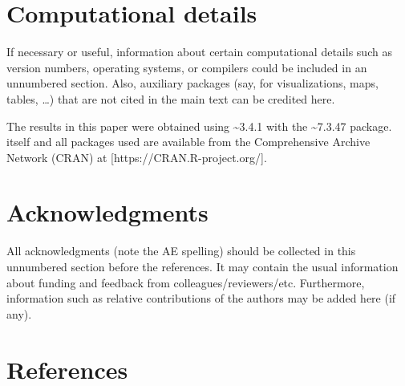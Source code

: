 \documentclass[
  nojss,
  article]{jss}
\begin{document}
\section*{Computational details}\label{computational-details}

\begin{tcolorbox}[enhanced jigsaw, colframe=quarto-callout-color-frame, colback=white, rightrule=.15mm, toprule=.15mm, breakable, arc=.35mm, bottomrule=.15mm, leftrule=.75mm, left=2mm, opacityback=0]

If necessary or useful, information about certain computational details
such as version numbers, operating systems, or compilers could be
included in an unnumbered section. Also, auxiliary packages (say, for
visualizations, maps, tables, \ldots) that are not cited in the main
text can be credited here.

\end{tcolorbox}

The results in this paper were obtained using
\textasciitilde3.4.1 with the
\textasciitilde7.3.47 package.  itself and all
packages used are available from the Comprehensive  Archive
Network (CRAN) at {[}https://CRAN.R-project.org/{]}.

\section*{Acknowledgments}\label{acknowledgments}

\begin{tcolorbox}[enhanced jigsaw, colframe=quarto-callout-color-frame, colback=white, rightrule=.15mm, toprule=.15mm, breakable, arc=.35mm, bottomrule=.15mm, leftrule=.75mm, left=2mm, opacityback=0]

All acknowledgments (note the AE spelling) should be collected in this
unnumbered section before the references. It may contain the usual
information about funding and feedback from colleagues/reviewers/etc.
Furthermore, information such as relative contributions of the authors
may be added here (if any).

\end{tcolorbox}

\section*{References}\label{references}
\end{document}
